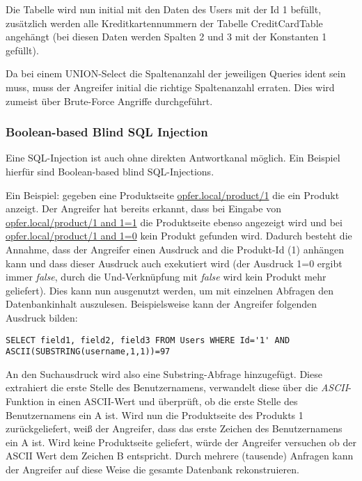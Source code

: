 Die Tabelle wird nun initial mit den Daten des Users mit der Id 1 befüllt, zusätzlich werden alle Kreditkartennummern der Tabelle CreditCardTable angehängt (bei diesen Daten werden Spalten 2 und 3 mit der Konstanten 1 gefüllt).

Da bei einem UNION-Select die Spaltenanzahl der jeweiligen Queries ident sein muss, muss der Angreifer initial die richtige Spaltenanzahl erraten. Dies wird zumeist über Brute-Force Angriffe durchgeführt.

\subsubsection{Boolean-based Blind SQL Injection}

Eine SQL-Injection ist auch ohne direkten Antwortkanal möglich. Ein Beispiel hierfür sind Boolean-based blind SQL-Injections.

Ein Beispiel: gegeben eine Produktseite \url{opfer.local/product/1} die ein Produkt anzeigt. Der Angreifer hat bereits erkannt, dass bei Eingabe von \url{opfer.local/product/1 and 1=1} die Produktseite ebenso angezeigt wird und bei \url{opfer.local/product/1 and 1=0} kein Produkt gefunden wird. Dadurch besteht die Annahme, dass der Angreifer einen Ausdruck and die Produkt-Id (1) anhängen kann und dass dieser Ausdruck auch exekutiert wird (der Ausdruck 1=0 ergibt immer \textit{false}, durch die Und-Verknüpfung mit \textit{false} wird kein Produkt mehr geliefert). Dies kann nun ausgenutzt werden, um mit einzelnen Abfragen den Datenbankinhalt auszulesen. Beispielsweise kann der Angreifer folgenden Ausdruck bilden:

\begin{verbatim}
SELECT field1, field2, field3 FROM Users WHERE Id='1' AND ASCII(SUBSTRING(username,1,1))=97
\end{verbatim}

An den Suchausdruck wird also eine Substring-Abfrage hinzugefügt. Diese extrahiert die erste Stelle des Benutzernamens, verwandelt diese über die \textit{ASCII}-Funktion in einen ASCII-Wert und überprüft, ob die erste Stelle des Benutzernamens ein A ist. Wird nun die Produktseite des Produkts 1 zurückgeliefert, weiß der Angreifer, dass das erste Zeichen des Benutzernamens ein A ist. Wird keine Produktseite geliefert, würde der Angreifer versuchen ob der ASCII Wert dem Zeichen B entspricht. Durch mehrere (tausende) Anfragen kann der Angreifer auf diese Weise die gesamte Datenbank rekonstruieren.

